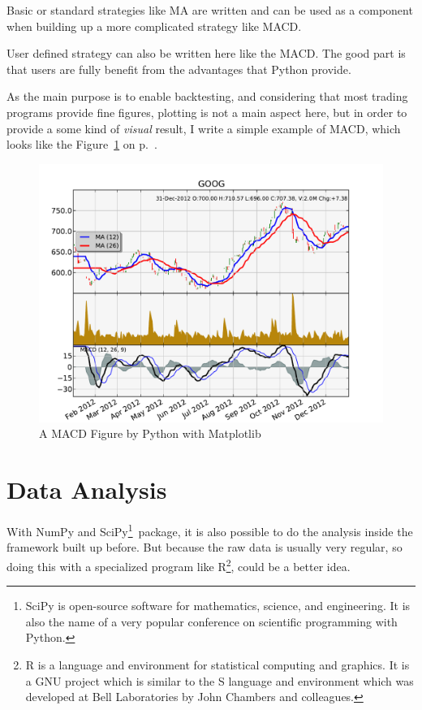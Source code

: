 \documentclass[12pt,a4paper]{article}
\begin{document}
Basic or standard strategies like MA are written and can be used as a 
component when building up a more complicated strategy like MACD.

User defined strategy can also be written here like the MACD. 
The good part is that 
users are fully benefit from the advantages that Python provide.

As the main purpose is to enable backtesting, and considering 
that most trading programs provide fine figures,
plotting is not a main aspect here,
but in order to provide a some kind of \emph{visual} result, I write a simple
example of MACD, which looks like the 
Figure~\ref{fig:macd-plot} on p.~\pageref{fig:macd-plot}.


\begin{figure}[H]
\centering
\includegraphics[width=\textwidth]{image/macd-plot.pdf}
\caption{A MACD Figure by Python with Matplotlib\label{fig:macd-plot}}
\end{figure}

\section{Data Analysis}
With NumPy and SciPy\footnote{SciPy is open-source software for 
mathematics, science, and engineering. 
It is also the name of a very popular conference 
on scientific programming with Python.}~package, 
it is also possible to do the analysis inside 
the framework built up before. But because the raw data 
is usually very regular, so doing this with a 
specialized program like R\footnote{
R is a language and environment for statistical computing and graphics. 
It is a GNU project which is similar to the S language and environment 
which was developed at Bell Laboratories 
by John Chambers and colleagues.}, could be a better idea.
\end{document}
